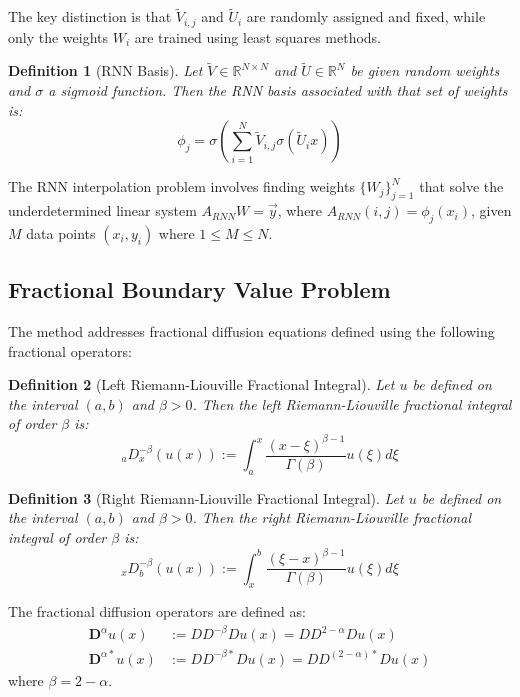 \documentclass[11pt]{article}
\newtheorem{definition}{Definition}
\begin{document}
The key distinction is that $\tilde{V}_{i,j}$ and $\tilde{U}_i$ are randomly assigned and fixed, while only the weights $W_i$ are trained using least squares methods.

\begin{definition}[RNN Basis]
Let $\tilde{V} \in \mathbb{R}^{N \times N}$ and $\tilde{U} \in \mathbb{R}^N$ be given random weights and $\sigma$ a sigmoid function. Then the RNN basis associated with that set of weights is:
\begin{equation}
\phi_j = \sigma\left(\sum_{i=1}^{N} \tilde{V}_{i,j} \sigma(\tilde{U}_i x)\right)
\end{equation}
\end{definition}

The RNN interpolation problem involves finding weights $\{W_j\}_{j=1}^N$ that solve the underdetermined linear system $A_{RNN}W = \vec{y}$, where $A_{RNN}(i,j) = \phi_j(x_i)$, given $M$ data points $(x_i, y_i)$ where $1 \leq M \leq N$.

\subsection{Fractional Boundary Value Problem}

The method addresses fractional diffusion equations defined using the following fractional operators:

\begin{definition}[Left Riemann-Liouville Fractional Integral]
Let $u$ be defined on the interval $(a,b)$ and $\beta > 0$. Then the left Riemann-Liouville fractional integral of order $\beta$ is:
\begin{equation}
{_a}D_x^{-\beta}(u(x)) := \int_a^x \frac{(x-\xi)^{\beta-1}}{\Gamma(\beta)} u(\xi) d\xi
\end{equation}
\end{definition}

\begin{definition}[Right Riemann-Liouville Fractional Integral]
Let $u$ be defined on the interval $(a,b)$ and $\beta > 0$. Then the right Riemann-Liouville fractional integral of order $\beta$ is:
\begin{equation}
{_x}D_b^{-\beta}(u(x)) := \int_x^b \frac{(\xi-x)^{\beta-1}}{\Gamma(\beta)} u(\xi) d\xi
\end{equation}
\end{definition}

The fractional diffusion operators are defined as:
\begin{align}
\mathbf{D}^\alpha u(x) &:= DD^{-\beta}Du(x) = DD^{2-\alpha}Du(x) \\
\mathbf{D}^{\alpha*}u(x) &:= DD^{-\beta*}Du(x) = DD^{(2-\alpha)*}Du(x)
\end{align}
where $\beta = 2-\alpha$.
\end{document}
